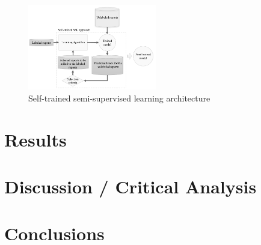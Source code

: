 \documentclass[11pt]{article}
\begin{document}
\begin{figure}[t]
    \centering
    \includegraphics[width=0.5\textwidth]{Self-trained-semi-supervised-learning-architecture.png}
    \caption{Self-trained semi-supervised learning architecture \cite{Self-trained-semi-supervised-learning}}
    \label{fig:Self-trained}
\end{figure}




\section{Results}

\section{Discussion / Critical Analysis}

\section{Conclusions}
\end{document}
